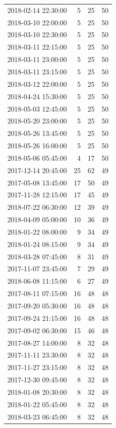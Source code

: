 \begin{tabular}{lrrr}
2018-02-14 22:30:00 & 5 & 25 & 50 \\
2018-03-10 22:00:00 & 5 & 25 & 50 \\
2018-03-10 22:30:00 & 5 & 25 & 50 \\
2018-03-11 22:15:00 & 5 & 25 & 50 \\
2018-03-11 23:00:00 & 5 & 25 & 50 \\
2018-03-11 23:15:00 & 5 & 25 & 50 \\
2018-03-12 22:00:00 & 5 & 25 & 50 \\
2018-04-24 15:30:00 & 5 & 25 & 50 \\
2018-05-03 12:45:00 & 5 & 25 & 50 \\
2018-05-20 23:00:00 & 5 & 25 & 50 \\
2018-05-26 13:45:00 & 5 & 25 & 50 \\
2018-05-26 16:00:00 & 5 & 25 & 50 \\
2018-05-06 05:45:00 & 4 & 17 & 50 \\
2017-12-14 20:45:00 & 25 & 62 & 49 \\
2017-05-08 13:45:00 & 17 & 50 & 49 \\
2017-11-28 12:15:00 & 17 & 45 & 49 \\
2018-07-22 06:30:00 & 12 & 39 & 49 \\
2018-04-09 05:00:00 & 10 & 36 & 49 \\
2018-01-22 08:00:00 & 9 & 34 & 49 \\
2018-01-24 08:15:00 & 9 & 34 & 49 \\
2018-03-28 07:45:00 & 8 & 31 & 49 \\
2017-11-07 23:45:00 & 7 & 29 & 49 \\
2018-06-08 11:15:00 & 6 & 27 & 49 \\
2017-08-11 07:15:00 & 16 & 48 & 48 \\
2017-09-20 05:30:00 & 16 & 48 & 48 \\
2017-09-24 21:15:00 & 16 & 48 & 48 \\
2017-09-02 06:30:00 & 15 & 46 & 48 \\
2017-08-27 14:00:00 & 8 & 32 & 48 \\
2017-11-11 23:30:00 & 8 & 32 & 48 \\
2017-11-27 23:15:00 & 8 & 32 & 48 \\
2017-12-30 09:45:00 & 8 & 32 & 48 \\
2018-01-08 20:30:00 & 8 & 32 & 48 \\
2018-01-22 05:45:00 & 8 & 32 & 48 \\
2018-03-23 06:45:00 & 8 & 32 & 48 \\

\end{tabular}

